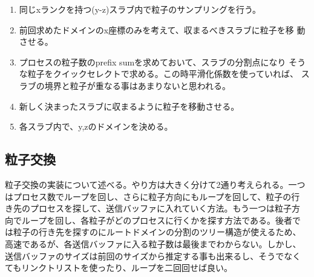 \begin{enumerate}
\item 同じxランクを持つ(y-z)スラブ内で粒子のサンプリングを行う。
\item 前回求めたドメインのx座標のみを考えて、収まるべきスラブに粒子を移
  動させる。
\item プロセスの粒子数のprefix sumを求めておいて、スラブの分割点になり
  そうな粒子をクイックセレクトで求める。この時平滑化係数を使っていれば、
  スラブの境界と粒子が重なる事はあまりないと思われる。
\item 新しく決まったスラブに収まるように粒子を移動させる。
\item 各スラブ内で、y,zのドメインを決める。
\end{enumerate}


\subsection{粒子交換}

粒子交換の実装について述べる。やり方は大きく分けて2通り考えられる。一つ
はプロセス数でループを回し、さらに粒子方向にもループを回して、粒子の行
き先のプロセスを探して、送信バッファに入れていく方法。もう一つは粒子方
向でループを回し、各粒子がどのプロセスに行くかを探す方法である。後者で
は粒子の行き先を探すのにルートドメインの分割のツリー構造が使えるため、
高速であるが、各送信バッファに入る粒子数は最後までわからない。しかし、
送信バッファのサイズは前回のサイズから推定する事も出来るし、そうでなく
てもリンクトリストを使ったり、ループを二回回せば良い。


